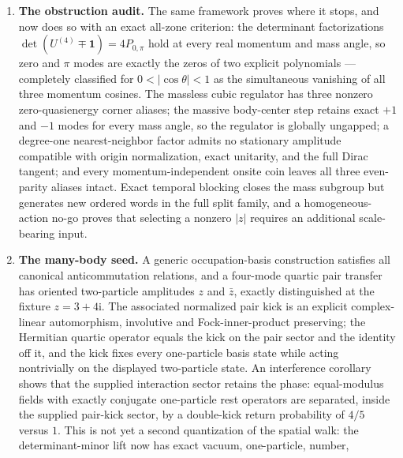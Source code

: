 \documentclass[11pt]{article}
\newcommand{\ii}{\mathrm{i}}
\newcommand{\id}{\mathbf{1}}
\begin{document}
\begin{enumerate}[leftmargin=2em]
  finite-to-analytic momentum-sign bridge is exact, an iterated three-torus
  Plancherel theorem gives the exact $N^{-3}$ wave-packet normalization, and a
  compact-support multiplier theorem yields momentum-space $L^2$ convergence
  at every fixed time.  Arbitrary position-dependent Pluecker fields evolve
  unitarily, and site-dependent chiral rotation induces exact endpoint links.
  \item \textbf{The obstruction audit.}  The same framework proves where it
  stops, and now does so with an exact all-zone criterion: the determinant
  factorizations $\det(U^{(4)}\mp\id)=4P_{0,\pi}$ hold at every real momentum
  and mass angle, so zero and $\pi$ modes are exactly the zeros of two
  explicit polynomials --- completely classified for $0<|\cos\theta|<1$ as
  the simultaneous vanishing of all three momentum cosines.  The massless
  cubic regulator has three nonzero
  zero-quasienergy
  corner aliases; the massive body-center step retains exact $+1$ and $-1$
  modes for every mass angle, so the regulator is globally ungapped; a
  degree-one nearest-neighbor factor admits no stationary amplitude compatible
  with origin normalization, exact unitarity, and the full Dirac tangent; and
  every momentum-independent onsite coin leaves all three even-parity aliases
  intact.  Exact temporal blocking closes the mass subgroup but generates new
  ordered words in the full split family, and a homogeneous-action no-go
  proves that selecting a nonzero $|z|$ requires an additional scale-bearing
  input.
  \item \textbf{The many-body seed.}  A generic occupation-basis construction
  satisfies all canonical anticommutation relations, and a four-mode quartic
  pair transfer has oriented two-particle amplitudes $z$ and $\bar z$, exactly
  distinguished at the fixture $z=3+4\ii$.  The associated normalized pair
  kick is an explicit complex-linear automorphism, involutive and
  Fock-inner-product preserving; the Hermitian quartic operator equals the
  kick on the pair sector and the identity off it, and the kick fixes every
  one-particle basis state while acting nontrivially on the displayed
  two-particle state.  An interference corollary shows that the supplied
  interaction sector retains the phase:
  equal-modulus fields with exactly conjugate one-particle rest operators
  are separated, inside the supplied pair-kick sector, by a double-kick
  return probability of $4/5$ versus $1$.  This is not yet a second quantization of the spatial
  walk: the determinant-minor lift now has exact vacuum, one-particle, number,

\end{enumerate}
\end{document}

